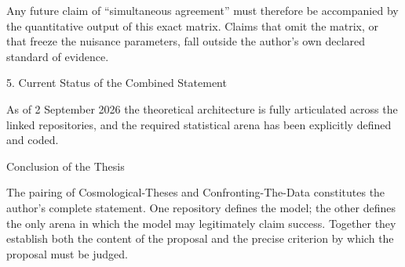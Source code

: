 Any future claim of “simultaneous agreement” must therefore be accompanied by the quantitative output of this exact matrix. Claims that omit the matrix, or that freeze the nuisance parameters, fall outside the author’s own declared standard of evidence.

5. Current Status of the Combined Statement

As of 2 September 2026 the theoretical architecture is fully articulated across the linked repositories, and the required statistical arena has been explicitly defined and coded.

Conclusion of the Thesis

The pairing of Cosmological-Theses and Confronting-The-Data constitutes the author’s complete statement. One repository defines the model; the other defines the only arena in which the model may legitimately claim success. Together they establish both the content of the proposal and the precise criterion by which the proposal must be judged.
